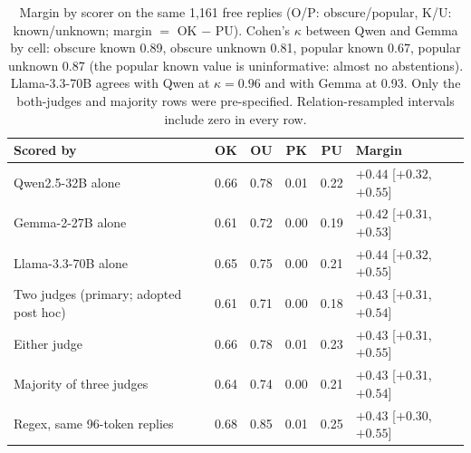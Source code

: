 \begin{table}[h]
\centering\footnotesize\setlength{\tabcolsep}{3pt}
\begin{tabular}{lccccl}
\toprule
Scored by & OK & OU & PK & PU & Margin \\
\midrule
Qwen2.5-32B alone & 0.66 & 0.78 & 0.01 & 0.22 & $+0.44$ [$+0.32$, $+0.55$] \\
Gemma-2-27B alone & 0.61 & 0.72 & 0.00 & 0.19 & $+0.42$ [$+0.31$, $+0.53$] \\
Llama-3.3-70B alone & 0.65 & 0.75 & 0.00 & 0.21 & $+0.44$ [$+0.32$, $+0.55$] \\
Two judges (primary; adopted post hoc) & 0.61 & 0.71 & 0.00 & 0.18 & $+0.43$ [$+0.31$, $+0.54$] \\
Either judge & 0.66 & 0.78 & 0.01 & 0.23 & $+0.43$ [$+0.31$, $+0.55$] \\
Majority of three judges & 0.64 & 0.74 & 0.00 & 0.21 & $+0.43$ [$+0.31$, $+0.54$] \\
Regex, same 96-token replies & 0.68 & 0.85 & 0.01 & 0.25 & $+0.43$ [$+0.30$, $+0.55$] \\
\bottomrule
\end{tabular}
\caption{Margin by scorer on the same 1,161 free replies (O/P: obscure/popular, K/U: known/unknown; margin $=$ OK $-$ PU). Cohen's $\kappa$ between Qwen and Gemma by cell: obscure known 0.89, obscure unknown 0.81, popular known 0.67, popular unknown 0.87 (the popular known value is uninformative: almost no abstentions). Llama-3.3-70B agrees with Qwen at $\kappa=0.96$ and with Gemma at 0.93. Only the both-judges and majority rows were pre-specified. Relation-resampled intervals include zero in every row.}
\label{tab:x0judges}
\end{table}

